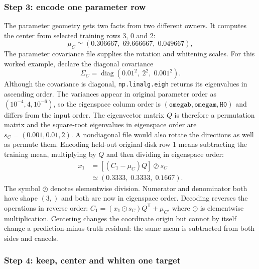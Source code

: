 \documentclass[10pt,aps,prd,twocolumn,nofootinbib]{revtex4-2}
\newcommand{\code}[1]{\texttt{#1}}
\begin{document}
\subsubsection{Step 3: encode one parameter row}

The parameter geometry gets two facts from two different owners.  It computes
the center from selected training rows 3, 0 and 2:
\begin{equation*}
 \mu_C\simeq(0.306667,\;69.666667,\;0.049667),
\end{equation*}
The parameter covariance file supplies the rotation and whitening scales.
For this worked example, declare the diagonal covariance
\begin{equation*}
 \Sigma_C=\operatorname{diag}(0.01^2,\;2^2,\;0.001^2).
\end{equation*}
Although the covariance is diagonal, \code{np.linalg.eigh} returns its
eigenvalues in ascending order.  The variances appear in original parameter
order as $(10^{-4},4,10^{-6})$, so the eigenspace column order is
$(\code{omegab},\code{omegam},\code{H0})$ and differs from the input order.  The
eigenvector matrix $Q$ is therefore a permutation matrix and the square-root
eigenvalues in eigenspace order are
$s_C=(0.001,0.01,2)$.  A nondiagonal file would also rotate the
directions as well as permute them.  Encoding held-out original
disk row 1 means subtracting the training mean, multiplying by $Q$ and then
dividing in eigenspace order:
\begin{align*}
 x_1
 &=\left[(C_1-\mu_C)Q\right]\oslash s_C\\
 &\simeq(0.3333,\;0.3333,\;0.1667).
\end{align*}
The symbol $\oslash$ denotes elementwise division.  Numerator and denominator
both have shape $(3,)$ and both are now in eigenspace order.  Decoding reverses
the operations in reverse order:
$C_1=(x_1\odot s_C)Q^{\mathsf T}+\mu_C$, where $\odot$ is elementwise
multiplication.  Centering changes the coordinate origin but cannot by itself
change a prediction-minus-truth residual: the same mean is subtracted from
both sides and cancels.

\subsubsection{Step 4: keep, center and whiten one target}
\end{document}
